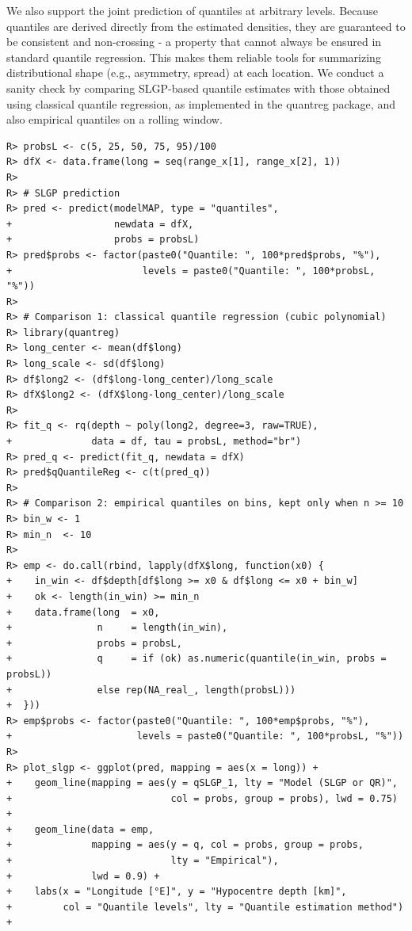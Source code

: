 \documentclass[
]{article}
\begin{document}
We also support the joint prediction of quantiles at arbitrary levels. Because quantiles are derived directly from the estimated densities, they are guaranteed to be consistent and non-crossing - a property that cannot always be ensured in standard quantile regression. This makes them reliable tools for summarizing distributional shape (e.g., asymmetry, spread) at each location.
We conduct a sanity check by comparing SLGP-based quantile estimates with those obtained using classical quantile regression, as implemented in the quantreg package, and also empirical quantiles on a rolling window.

\begin{verbatim}
R> probsL <- c(5, 25, 50, 75, 95)/100
R> dfX <- data.frame(long = seq(range_x[1], range_x[2], 1))
R> 
R> # SLGP prediction
R> pred <- predict(modelMAP, type = "quantiles",
+                  newdata = dfX,
+                  probs = probsL)
R> pred$probs <- factor(paste0("Quantile: ", 100*pred$probs, "%"),
+                       levels = paste0("Quantile: ", 100*probsL, "%"))
R> 
R> # Comparison 1: classical quantile regression (cubic polynomial)
R> library(quantreg)
R> long_center <- mean(df$long)
R> long_scale <- sd(df$long)
R> df$long2 <- (df$long-long_center)/long_scale
R> dfX$long2 <- (dfX$long-long_center)/long_scale
R> 
R> fit_q <- rq(depth ~ poly(long2, degree=3, raw=TRUE), 
+              data = df, tau = probsL, method="br")
R> pred_q <- predict(fit_q, newdata = dfX)
R> pred$qQuantileReg <- c(t(pred_q))
R> 
R> # Comparison 2: empirical quantiles on bins, kept only when n >= 10
R> bin_w <- 1  
R> min_n  <- 10
R> 
R> emp <- do.call(rbind, lapply(dfX$long, function(x0) {
+    in_win <- df$depth[df$long >= x0 & df$long <= x0 + bin_w]
+    ok <- length(in_win) >= min_n
+    data.frame(long  = x0,
+               n     = length(in_win),
+               probs = probsL,
+               q     = if (ok) as.numeric(quantile(in_win, probs = probsL))
+               else rep(NA_real_, length(probsL)))
+  }))
R> emp$probs <- factor(paste0("Quantile: ", 100*emp$probs, "%"),
+                      levels = paste0("Quantile: ", 100*probsL, "%"))
R> 
R> plot_slgp <- ggplot(pred, mapping = aes(x = long)) +
+    geom_line(mapping = aes(y = qSLGP_1, lty = "Model (SLGP or QR)",
+                            col = probs, group = probs), lwd = 0.75) +
+    geom_line(data = emp,
+              mapping = aes(y = q, col = probs, group = probs,
+                            lty = "Empirical"),
+              lwd = 0.9) +
+    labs(x = "Longitude [°E]", y = "Hypocentre depth [km]",
+         col = "Quantile levels", lty = "Quantile estimation method") +

\end{verbatim}
\end{document}
